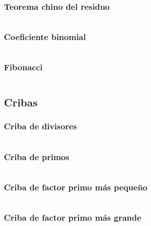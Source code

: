 \documentclass[11pt]{article}
\begin{document}
			\subsubsection{Teorema chino del residuo}
			\inputminted[tabsize=2,breaklines,firstline=950,lastline=964,fontsize=\small]{c++}{numberTheory.cpp}
			
			\subsubsection{Coeficiente binomial}
			\inputminted[tabsize=2,breaklines,firstline=433,lastline=440,fontsize=\small]{c++}{numberTheory.cpp}
			
			\subsubsection{Fibonacci}
			\inputminted[tabsize=2,breaklines,firstline=720,lastline=741,fontsize=\small]{c++}{numberTheory.cpp}
		
		\subsection{Cribas}
			\subsubsection{Criba de divisores}
			\inputminted[tabsize=2,breaklines,firstline=119,lastline=130,fontsize=\small]{c++}{numberTheory.cpp}
			
			\subsubsection{Criba de primos}
			\inputminted[tabsize=2,breaklines,firstline=132,lastline=146,fontsize=\small]{c++}{numberTheory.cpp}
			
			\subsubsection{Criba de factor primo más pequeño}
			\inputminted[tabsize=2,breaklines,firstline=150,lastline=159,fontsize=\small]{c++}{numberTheory.cpp}
			
			\subsubsection{Criba de factor primo más grande}
			\inputminted[tabsize=2,breaklines,firstline=939,lastline=947,fontsize=\small]{c++}{numberTheory.cpp}
			
\end{document}
